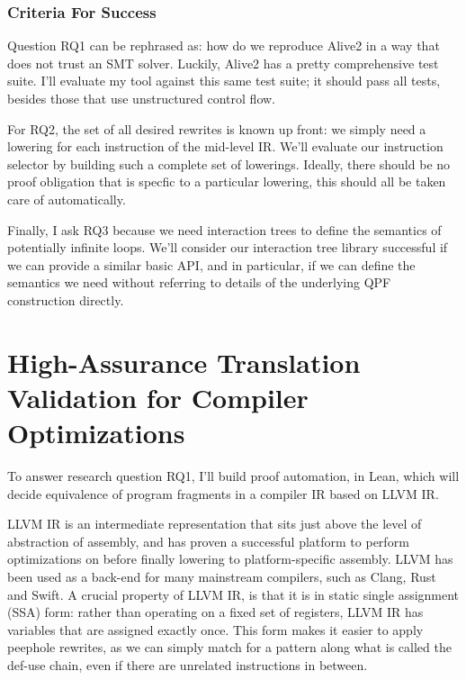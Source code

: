 \documentclass[a4paper]{scrartcl}
\begin{document}
\subsubsection*{Criteria For Success}

Question \textsc{RQ1} can be rephrased as: 
how do we reproduce Alive2 in a way that does not trust an SMT solver. 
Luckily, Alive2 has a pretty comprehensive test suite.
I'll evaluate my tool against this same test suite; it should pass all tests,
besides those that use unstructured control flow.

For \textsc{RQ2}, the set of all desired rewrites is known up front: we simply 
need a lowering for each instruction of the mid-level IR.
We'll evaluate our instruction selector by building such a complete set of lowerings.
Ideally, there should be no proof obligation that is specfic to a particular lowering,
this should all be taken care of automatically.

Finally, I ask \textsc{RQ3} because we need interaction trees to define the semantics
of potentially infinite loops. 
We'll consider our interaction tree library successful if
we can provide a similar basic API, and in particular, if we can define the 
semantics we need without referring to details of the underlying QPF construction directly.


\section{High-Assurance Translation Validation for Compiler
Optimizations}\label{high-assurance-translation-validation-for-compiler-optimizations}

To answer research question \textsc{RQ1}, I'll build proof automation, in Lean,
which will decide equivalence of program fragments in a compiler IR based on LLVM IR.

LLVM IR is an intermediate representation that sits just above the level
of abstraction of assembly, and has proven a successful platform to
perform optimizations on before finally lowering to platform-specific
assembly. LLVM has been used as a back-end for many mainstream
compilers, such as Clang, Rust and Swift. A crucial property of LLVM IR, is that it is in static single assignment
(SSA) form: rather than operating on a fixed set of registers, LLVM IR
has variables that are assigned exactly once. This form makes it easier
to apply peephole rewrites, as we can simply match for a pattern along
what is called the def-use chain, even if there are unrelated
instructions in between.
\end{document}
